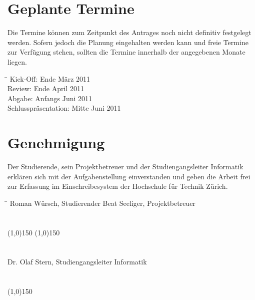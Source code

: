 \documentclass[listof=totoc,bibliography=totoc]{scrreprt}
\begin{document}
    \section{Geplante Termine}
    Die Termine können zum Zeitpunkt des Antrages noch nicht definitiv 
    festgelegt werden. Sofern jedoch die Planung eingehalten werden kann und 
    freie Termine zur Verfügung stehen, sollten die Termine innerhalb der 
    angegebenen Monate liegen.

    \begin{tabbing}
        \hspace*{4cm}\= \kill
    	Kick-Off:               \> Ende März 2011 \\
    	Review:                 \> Ende April 2011 \\
    	Abgabe:                 \> Anfangs Juni 2011 \\
    	Schlusspräsentation:    \> Mitte Juni 2011 \\
    \end{tabbing}

    \section{Genehmigung}
    Der Studierende, sein Projektbetreuer und der Studiengangsleiter 
    Informatik erklären sich mit der Aufgabenstellung einverstanden und geben 
    die Arbeit frei zur Erfassung im Einschreibesystem der Hochschule für 
    Technik Zürich.

    \begin{tabbing}
        \hspace*{10cm}\= \kill
    	Roman Würsch, Studierender \> Beat Seeliger, Projektbetreuer \\
    	\\
    	\\
        \line(1,0){150} \> \line(1,0){150} \\
        \\
        \\
    	Dr. Olaf Stern, Studiengangsleiter Informatik \\
    	\\
    	\\
        \line(1,0){150}
    \end{tabbing}    
\end{document}
